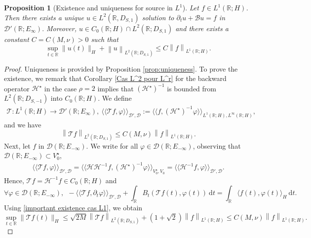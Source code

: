 \documentclass[11pt, letterpaper]{amsart}
\newtheorem{prop}[thm]{Proposition}
\theoremstyle{definition}
\theoremstyle{remark}
\newcommand{\llangle}{\langle\!\langle}
\newcommand{\rrangle}{\rangle\!\rangle}
\numberwithin{equation}{section}
\begin{document}
\begin{prop}[Existence and uniqueness for source in $L^1$] \label{prop:L1}
    Let $f \in L^1(\mathbb{R};H)$. Then there exists a unique $u \in L^2(\mathbb{R},D_{S,1})$ solution to
   $ \partial_t u +\mathcal{B} u =f$ in $\mathcal{D'}(\mathbb{R}; E_\infty).$
    Moreover, $u \in C_0(\mathbb{R}; H)\cap L^2(\mathbb{R};D_{S,1})$ and there exists a constant $C=C(M,\nu)>0$ such that 
    \begin{equation}\label{asked estimate}
        \sup_{t\in \mathbb{R}} \| u(t) \|_{H}+\left \| u \right \|_{L^2(\mathbb{R};D_{S,1})}
        \leq C\left \| f \right \|_{L^1(\mathbb{R};H)}.
    \end{equation}
\end{prop}
\begin{proof}
Uniqueness is provided by Proposition \ref{prop:uniqueness}. To prove the existence, we remark that  
 Corollary \ref{Cas L^2 pour L^r} for the backward operator $\mathcal{H}^\star$ in the case  $\rho=2$ implies that $(\mathcal{H}^\star)^{-1}$ is bounded from $L^2(\mathbb{R};D_{S,-1})$ into $C_0(\mathbb{R}; H)$. We define 
\begin{align*}
    \mathcal{T}: L^1(\mathbb{R};H) \rightarrow \mathcal{D'}(\mathbb{R};E_\infty), \   \llangle \mathcal{T}f, \varphi  \rrangle_{\mathcal{D}',\mathcal{D}}:= \llangle f, (\mathcal{H}^\star)^{-1}\varphi  \rrangle_{L^1(\mathbb{R};H),L^\infty(\mathbb{R};H)},
\end{align*}
and we have
\begin{equation}\label{1}
   \left \| \mathcal{T}f \right \|_{L^2(\mathbb{R};D_{S,1})}
   \leq C(M,\nu) \left \| f \right \|_{L^1(\mathbb{R};H)}.
\end{equation}
 Next, let $f$ in $\mathcal{D}(\mathbb{R};E_{-\infty})$. We write for all $\varphi \in \mathcal{D}(\mathbb{R};E_{-\infty})$, observing that $\mathcal{D}(\mathbb{R};E_{-\infty})\subset V_0^\star$,
\begin{align*}
   \llangle \mathcal{T}f, \varphi  \rrangle_{\mathcal{D}',\mathcal{D}} = \llangle \mathcal{H}\mathcal{H}^{-1}f, (\mathcal{H}^\star)^{-1}\varphi  \rrangle_{V_0^\star, V_0}= \llangle \mathcal{H}^{-1}f, \varphi  \rrangle_{\mathcal{D}',\mathcal{D}}.
\end{align*}
Hence, $\mathcal{T}f=\mathcal{H}^{-1}f \in C_0(\mathbb{R}; H)$ and
\begin{equation}\label{Eq}
    \forall \varphi \in \mathcal{D}(\mathbb{R};E_{-\infty}), \ \ -\llangle \mathcal{T}f, \partial_t \varphi \rrangle_{\mathcal{D}',\mathcal{D}} + \int_{\mathbb{R}} B_t(\mathcal{T}f(t),\varphi(t))\ \mathrm d t = \int_{\mathbb{R}} \langle f(t), \varphi(t) \rangle_H \ \mathrm d t.
\end{equation} 
Using  \eqref{important existence cas L1}, we obtain
\begin{equation}\label{2}
    \sup_{t\in \mathbb{R}} \| \mathcal{T}f(t) \|_{H} \leq \sqrt{2M} \left\| \mathcal{T}f \right\|_{L^2(\mathbb{R};D_{S,1})}+(1+\sqrt{2})\left\| f \right\|_{L^1(\mathbb{R};H)} \leq C(M,\nu) \left\| f \right\|_{L^1(\mathbb{R};H)}.
\end{equation}


\end{proof}
\end{document}
